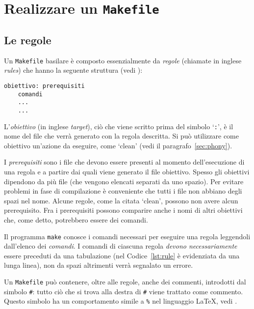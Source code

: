\cleardoublepage
\chapter{Realizzare un \texttt{Makefile}}
\label{cha:realizzare-makefile}

\section{Le regole}
\label{sec:le-regole}

Un \verb|Makefile| basilare è composto essenzialmente da \emph{regole} (chiamate
in inglese \emph{rules}) che hanno la seguente struttura (vedi
\textcite[3]{gnu:make}):
\begin{lstlisting}[showtabs=true,tab=\rightarrowfill,caption={Struttura di una
regola},label=lst:rule]
obiettivo: prerequisiti
	comandi
	...
	...
\end{lstlisting}

L'\emph{obiettivo} (in inglese \emph{target}), ciò che viene scritto prima del
simbolo `\verb|:|', è il nome del file che verrà generato con la regola
descritta.  Si può utilizzare come obiettivo un'azione da eseguire, come `clean'
(vedi il paragrafo~\vref{sec:phony}).

I \emph{prerequisiti} sono i file che devono essere presenti al momento
dell'esecuzione di una regola e a partire dai quali viene generato il file
obiettivo.  Spesso gli obiettivi dipendono da più file (che vengono elencati
separati da uno spazio).  Per evitare problemi in fase di compilazione è
conveniente che tutti i file non abbiano degli spazi nel nome.  Alcune regole,
come la citata `clean', possono non avere alcun prerequisito.  Fra i
prerequisiti possono comparire anche i nomi di altri obiettivi che, come detto,
potrebbero essere dei comandi.

Il programma \verb|make| conosce i comandi necessari per eseguire una regola
leggendoli dall'elenco dei \emph{comandi}.  I comandi di ciascuna regola
\emph{devono necessariamente} essere preceduti da una tabulazione (nel
Codice~\ref{lst:rule} è evidenziata da una lunga linea), non da spazi altrimenti
verrà segnalato un errore.

Un \verb|Makefile| può contenere, oltre alle regole, anche dei commenti,
introdotti dal simbolo \verb|#|: tutto ciò che si trova alla destra di \verb|#|
viene trattato come commento.  Questo simbolo ha un comportamento simile a
\verb|%| nel linguaggio \LaTeX{}, vedi \textcite[26]{pantieri:latex}.

